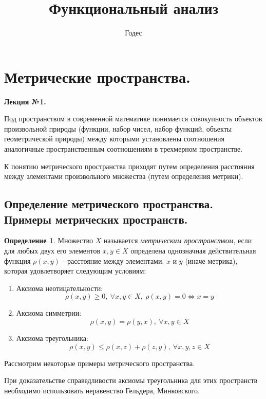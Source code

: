 \documentclass[14pt,a4paper]{extarticle}
\title{\textbf{Функциональный анализ}}
\author{Годес}
\date{}
\theoremstyle{definition}
\newtheorem{definition}{Определение}[section]
\theoremstyle{remark}
\renewcommand{\[}{\begin{dmath*}[compact]}
\renewcommand{\]}{\end{dmath*}}
\newcommand{\be}{\begin{enumerate}}
\newcommand{\ee}{\end{enumerate}}
\newcommand{\sep}{ , \ \allowbreak }
\begin{document}
\sloppy
\maketitle

\tableofcontents

\section{Метрические пространства.} \label{sec:mp}

\textbf{Лекция №1.}

Под пространством в современной математике понимается совокупность объектов
произвольной природы (функции, набор чисел, набор функций, объекты
геометрической природы) между которыми установлены соотношения аналогичные
пространственным соотношениям в трехмерном пространстве.

К понятию метрического пространства приходят путем определения расстояния между
элементами произвольного множества (путем определения метрики).

\subsection{Определение метрического пространства.
Примеры метрических пространств.}

\begin{definition}
  Множество $X$ называется \textit{метрическим пространством},
  если для любых двух его элементов $x, y \in X$
  определена однозначная действительная функция
  $\rho(x, y)$ - расстояние между элементами.
  $x$ и $y$ (иначе метрика), которая удовлетворяет следующим условиям:

  \be
    \item Аксиома неотицательности:
    \[ {\rho(x, y) \geq 0} \sep {\forall x, y \in X} \sep
    {\rho(x, y) = 0} \Leftrightarrow {x = y} \]
    \item Аксиома симметрии:
    \[{\rho(x, y) = \rho(y, x)} \sep {\forall x, y \in X}\]
    \item Аксиома треугольника:
    \[\rho(x, y) \leq {\rho(x, z) + \rho(z, y)} \sep
    {\forall x, y, z \in X}\]
  \ee
\end{definition}

Рассмотрим некоторые примеры метрического пространства.

При доказательстве справедливости аксиомы треугольника для этих пространств
необходимо использовать неравенство Гельдера, Минковского.
\end{document}
